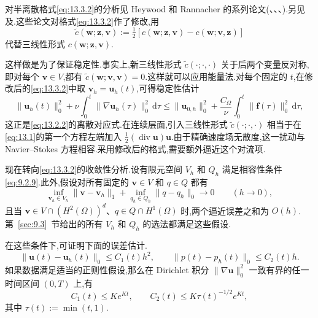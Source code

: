 对半离散格式\eqref{eq:13.3.2}的分析见 Heywood 和 Rannacher 的系列论文(、、、).另见及.这些论文对格式\eqref{eq:13.3.2}作了修改,用
\[
  \widetilde c(\boldsymbol{w};\boldsymbol{z},\boldsymbol{v})
    :=\tfrac12[c(\boldsymbol{w};\boldsymbol{z},\boldsymbol{v})-c(\boldsymbol{w};\boldsymbol{v},\boldsymbol{z})]
\]
代替三线性形式 \(c(\boldsymbol{w};\boldsymbol{z},\boldsymbol{v})\).

这样做是为了保证稳定性.事实上,新三线性形式 \(\widetilde c(\cdot;\cdot,\cdot)\) 关于后两个变量反对称,即对每个 \(\boldsymbol{v}\in V\),都有 \(\widetilde c(\boldsymbol{w};\boldsymbol{v},\boldsymbol{v})=0\).这样就可以应用能量法.对每个固定的 \(t\),在修改后的\eqref{eq:13.3.2}中取 \(\boldsymbol{v}_h=\boldsymbol{u}_h(t)\),可得稳定性估计
\begin{equation}\label{eq:13.3.3}
  \|\boldsymbol{u}_h(t)\|_0^2+\nu\int_0^t\|\nabla\boldsymbol{u}_h(\tau)\|_0^2\,\mathrm d\tau
   \le\|\boldsymbol{u}_{0,h}\|_0^2+\frac{C_\Omega}{\nu}
         \int_0^t\|\boldsymbol{f}(\tau)\|_0^2\,\mathrm d\tau,
\end{equation}
这正是\eqref{eq:13.2.2}的离散对应式.在连续层面,引入三线性形式 \(\widetilde c(\cdot;\cdot,\cdot)\) 相当于在\eqref{eq:13.1}的第一个方程左端加入 \(\tfrac12(\operatorname{div}\boldsymbol{u})\boldsymbol{u}\).由于精确速度场无散度,这一扰动与 Navier--Stokes 方程相容.采用修改后的格式,需要额外逼近这个对流项.

现在转向\eqref{eq:13.3.2}的收敛性分析.设有限元空间 \(V_h\) 和 \(Q_h\) 满足相容性条件\eqref{eq:9.2.9}.此外,假设对所有固定的 \(\boldsymbol{v}\in V\) 和 \(q\in Q\) 都有
\[
  \inf_{\boldsymbol{v}_h\in V_h}\|\boldsymbol{v}-\boldsymbol{v}_h\|_1
     +\inf_{q_h\in Q_h}\|q-q_h\|_0\longrightarrow0
     \qquad(h\to0),
\]
且当 \(\boldsymbol{v}\in V\cap(H^2(\Omega))^d\)、\(q\in Q\cap H^1(\Omega)\) 时,两个逼近误差之和为 \(O(h)\).第~\ref{sec:9.3}~节给出的所有 \(V_h\) 和 \(Q_h\) 的选法都满足这些假设.

在这些条件下,可证明下面的误差估计.
\begin{equation}\label{eq:13.3.4}
  \|\boldsymbol{u}(t)-\boldsymbol{u}_h(t)\|_0\le C_1(t)h^2,\qquad
  \|p(t)-p_h(t)\|_0\le C_2(t)h.
\end{equation}
如果数据满足适当的正则性假设,那么在 Dirichlet 积分 \(\|\nabla\boldsymbol{u}\|_0^2\) 一致有界的任一时间区间 \((0,T)\) 上,有
\begin{equation}\label{eq:13.3.5}
  C_1(t)\le Ke^{Kt},\qquad C_2(t)\le K\tau(t)^{-1/2}e^{Kt},
\end{equation}
其中 \(\tau(t):=\min(t,1)\).

